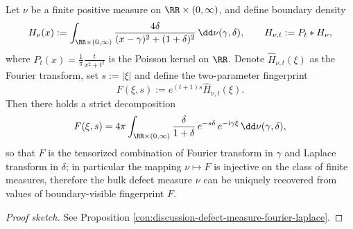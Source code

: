 \begin{conclusion}\label{con:xi-terminal-defect-measure-fourier-laplace-holographic}
Let \(\nu\) be a finite positive measure on \(\RR\times(0,\infty)\), and define boundary density
\[
H_\nu(x):=\int_{\RR\times(0,\infty)}\frac{4\delta}{(x-\gamma)^2+(1+\delta)^2}\,\dd\nu(\gamma,\delta),
\qquad
H_{\nu,t}:=P_t*H_\nu,
\]
where \(P_t(x)=\frac{1}{\pi}\frac{t}{x^2+t^2}\) is the Poisson kernel on \(\RR\).
Denote \(\widehat{H}_{\nu,t}(\xi)\) as the Fourier transform, set \(s:=|\xi|\) and define the two-parameter fingerprint
\[
F(\xi,s):=e^{(t+1)s}\widehat{H}_{\nu,t}(\xi).
\]
Then there holds a strict decomposition
\[
F(\xi,s)=4\pi\int_{\RR\times(0,\infty)}\frac{\delta}{1+\delta}\,e^{-s\delta}\,e^{-\mathrm{i}\gamma\xi}\,\dd\nu(\gamma,\delta),
\]
so that \(F\) is the tensorized combination of Fourier transform in \(\gamma\) and Laplace transform in \(\delta\); in particular the mapping \(\nu\mapsto F\) is injective on the class of finite measures,
therefore the bulk defect measure \(\nu\) can be uniquely recovered from values of boundary-visible fingerprint \(F\).
\end{conclusion}
\begin{proof}[Proof sketch]
See Proposition \ref{con:discussion-defect-measure-fourier-laplace}.
\end{proof}

